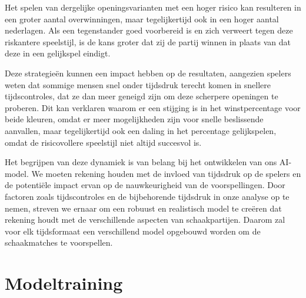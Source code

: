 Het spelen van dergelijke openingsvarianten met een hoger risico kan resulteren in een groter aantal overwinningen, maar tegelijkertijd ook in een hoger aantal nederlagen. Als een tegenstander goed voorbereid is en zich verweert tegen deze riskantere speelstijl, is de kans groter dat zij de partij winnen in plaats van dat deze in een gelijkspel eindigt.

Deze strategieën kunnen een impact hebben op de resultaten, aangezien spelers weten dat sommige mensen snel onder tijdsdruk terecht komen in snellere tijdscontroles, dat ze dan meer geneigd zijn om deze scherpere openingen te proberen. Dit kan verklaren waarom er een stijging is in het winstpercentage voor beide kleuren, omdat er meer mogelijkheden zijn voor snelle beslissende aanvallen, maar tegelijkertijd ook een daling in het percentage gelijkspelen, omdat de risicovollere speelstijl niet altijd succesvol is.

Het begrijpen van deze dynamiek is van belang bij het ontwikkelen van ons AI-model. We moeten rekening houden met de invloed van tijdsdruk op de spelers en de potentiële impact ervan op de nauwkeurigheid van de voorspellingen. Door factoren zoals tijdscontroles en de bijbehorende tijdsdruk in onze analyse op te nemen, streven we ernaar om een robuust en realistisch model te creëren dat rekening houdt met de verschillende aspecten van schaakpartijen. Daarom zal voor elk tijdsformaat een verschillend model opgebouwd worden om de schaakmatches te voorspellen. 

\section{Modeltraining}


